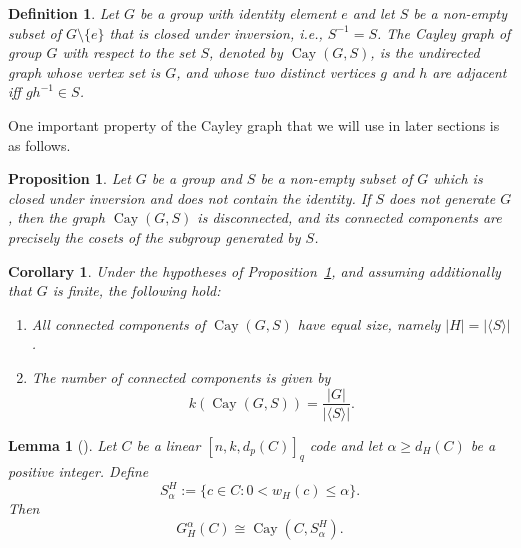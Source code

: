 \documentclass[11pt,draftclsnofoot,journal,onecolumn]{IEEEtran}
\newtheorem{definition}{Definition}
\newtheorem{lemma}{Lemma}
\newtheorem{proposition}{Proposition}
\newtheorem{corollary}{Corollary}
\begin{document}
    \begin{definition}
    \label{def:cayley}
        Let $G$ be a group with identity element $e$ and let $S$ be a non-empty subset of $G \setminus \{e\}$ that is closed under inversion, i.e., $S^{-1} = S$. The Cayley graph of group $G$ with respect to the set $S$, denoted by $\operatorname{Cay}(G, S)$, is the undirected graph whose vertex set is $G$, and whose two distinct vertices $g$ and $h$ are adjacent iff $gh^{-1} \in S$.
    \end{definition}

    One important property of the Cayley graph that we will use in later sections is as follows.

    \begin{proposition}\label{prop:cayley-connectivity}
        Let $G$ be a group and $S$ be a non-empty subset of $G$ which is closed under inversion and does not contain the identity. If $S$ does not generate $G$, then the graph $\operatorname{Cay}(G, S)$ is disconnected, and its connected components are precisely the cosets of the subgroup generated by $S$. 
    \end{proposition}

    \begin{corollary}\label{cor:cayley-components}
    Under the hypotheses of Proposition~\ref{prop:cayley-connectivity}, and assuming additionally that \(G\) is finite, the following hold:
    \begin{enumerate}
    \item All connected components of \(\operatorname{Cay}(G, S)\) have equal size, namely \(|H| = |\langle S \rangle|\).
    \item The number of connected components is given by
    \[
    k(\operatorname{Cay}(G, S)) = \frac{|G|}{|\langle S \rangle|}.
    \]
    \end{enumerate}
    \end{corollary}

    \begin{lemma}[\cite{rajput2025function}]\label{lem:cayley-hamming}
    Let \(C\) be a linear $[n,k,d_p(C)]_q$ code and let \(\alpha \ge d_H(C)\) be a positive integer. Define
    \[
    S_\alpha^H := \{ c \in C : 0 < w_H(c) \le \alpha \}.
    \]
    Then 
    \[
        G_H^{\alpha}(C) \cong \operatorname{Cay}(C, S_\alpha^H).
    \]
    \end{lemma}

   

    

\end{document}
